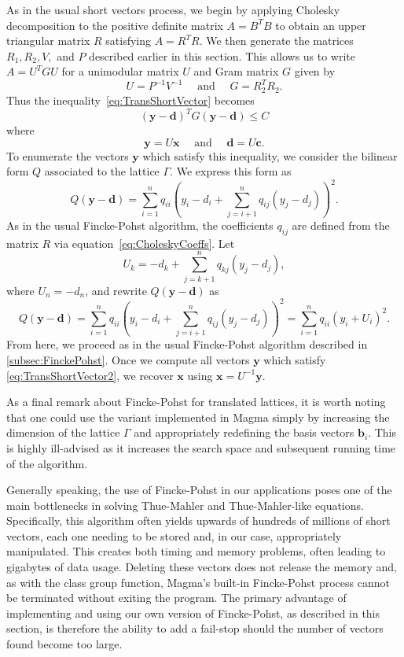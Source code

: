 \documentclass[11pt]{report}
\theoremstyle{definition}
\begin{document}
As in the usual short vectors process, we begin by applying Cholesky decomposition to the positive definite matrix $A=B^TB$ to obtain an upper triangular matrix $R$ satisfying $A = R^TR$. We then generate the matrices $R_1, R_2, V,$ and $P$ described earlier in this section. This allows us to write $A = U^TGU$ for a unimodular matrix $U$ and Gram matrix $G$ given by
\[U = P^{-1}V^{-1} \quad \text{ and } \quad G = R_2^TR_2.\]
Thus the inequality~\eqref{eq:TransShortVector} becomes
\begin{equation} \label{eq:TransShortVector2}
(\mathbf{y}-\mathbf{d})^TG(\mathbf{y}-\mathbf{d}) \leq C
\end{equation}
where
\[\mathbf{y} = U\mathbf{x} \quad \text{ and } \quad \mathbf{d} = U\mathbf{c}.\]
To enumerate the vectors $\mathbf{y}$ which satisfy this inequality, we consider the bilinear form $Q$ associated to the lattice $\Gamma$. We express this form as
\[ Q(\mathbf{y}-\mathbf{d}) = \sum_{i=1}^n q_{ii}\left( y_i - d_i + \sum_{j=i+1}^n q_{ij}(y_j - d_j)\right)^2.\]
As in the usual Fincke-Pohst algorithm, the coefficients $q_{ij}$ are defined from the matrix $R$ via equation~\eqref{eq:CholeskyCoeffs}. Let
\[U_k = -d_k + \sum_{j = k+1}^n q_{kj}(y_j - d_j),\]
where $U_n = -d_n$, and rewrite $Q(\mathbf{y}-\mathbf{d})$ as
\[ Q(\mathbf{y}-\mathbf{d}) = \sum_{i=1}^n q_{ii}\left( y_i - d_i + \sum_{j=i+1}^n q_{ij}(y_j - d_j)\right)^2 = \sum_{i=1}^n q_{ii}\left( y_i + U_i\right)^2.\]
From here, we proceed as in the usual Fincke-Pohst algorithm described in \autoref{subsec:FinckePohst}. Once we compute all vectors $\mathbf{y}$ which satisfy \eqref{eq:TransShortVector2}, we recover $\mathbf{x}$ using $\mathbf{x} = U^{-1}\mathbf{y}$.

As a final remark about Fincke-Pohst for translated lattices, it is worth noting that one could use the variant implemented in Magma simply by increasing the dimension of the lattice $\Gamma$ and appropriately redefining the basis vectors $\mathbf{b}_i$. This is highly ill-advised as it increases the search space and subsequent running time of the algorithm.

Generally speaking, the use of Fincke-Pohst in our applications poses one of the main bottlenecks in solving Thue-Mahler and Thue-Mahler-like equations. Specifically, this algorithm often yields upwards of hundreds of millions of short vectors, each one needing to be stored and, in our case, appropriately manipulated. This creates both timing and memory problems, often leading to gigabytes of data usage. Deleting these vectors does not release the memory and, as with the class group function, Magma's built-in Fincke-Pohst process cannot be terminated without exiting the program. The primary advantage of implementing and using our own version of Fincke-Pohst, as described in this section, is therefore the ability to add a fail-stop should the number of vectors found become too large.
\end{document}
